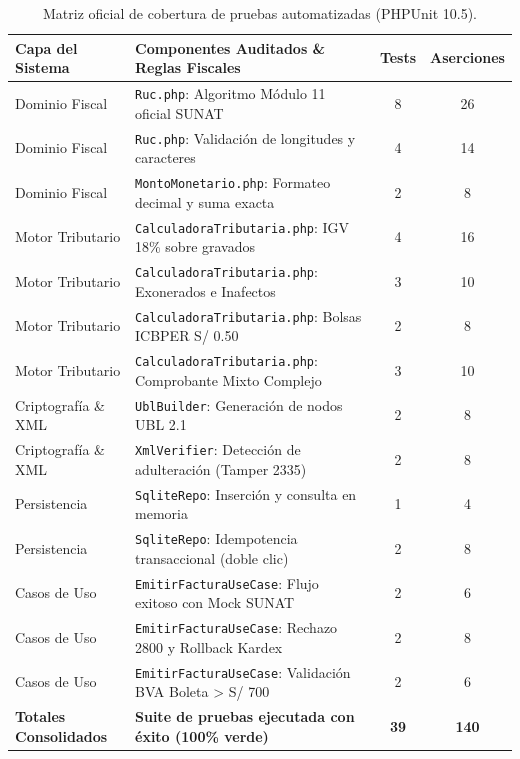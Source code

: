 \documentclass[11pt,a4paper]{article}
\begin{document}
\begin{table}[h!]
\centering
\small
\caption{Matriz oficial de cobertura de pruebas automatizadas (PHPUnit 10.5).}
\label{tab:matriz_cobertura}
\begin{tabularx}{\textwidth}{p{3.5cm}Xcc}
\toprule
\textbf{Capa del Sistema} & \textbf{Componentes Auditados \& Reglas Fiscales} & \textbf{Tests} & \textbf{Aserciones} \\
\midrule
Dominio Fiscal & \texttt{Ruc.php}: Algoritmo Módulo 11 oficial SUNAT & 8 & 26 \\
Dominio Fiscal & \texttt{Ruc.php}: Validación de longitudes y caracteres & 4 & 14 \\
Dominio Fiscal & \texttt{MontoMonetario.php}: Formateo decimal y suma exacta & 2 & 8 \\
\midrule
Motor Tributario & \texttt{CalculadoraTributaria.php}: IGV 18\% sobre gravados & 4 & 16 \\
Motor Tributario & \texttt{CalculadoraTributaria.php}: Exonerados e Inafectos & 3 & 10 \\
Motor Tributario & \texttt{CalculadoraTributaria.php}: Bolsas ICBPER S/ 0.50 & 2 & 8 \\
Motor Tributario & \texttt{CalculadoraTributaria.php}: Comprobante Mixto Complejo & 3 & 10 \\
\midrule
Criptografía \& XML & \texttt{UblBuilder}: Generación de nodos UBL 2.1 & 2 & 8 \\
Criptografía \& XML & \texttt{XmlVerifier}: Detección de adulteración (Tamper 2335) & 2 & 8 \\
\midrule
Persistencia & \texttt{SqliteRepo}: Inserción y consulta en memoria & 1 & 4 \\
Persistencia & \texttt{SqliteRepo}: Idempotencia transaccional (doble clic) & 2 & 8 \\
\midrule
Casos de Uso & \texttt{EmitirFacturaUseCase}: Flujo exitoso con Mock SUNAT & 2 & 6 \\
Casos de Uso & \texttt{EmitirFacturaUseCase}: Rechazo 2800 y Rollback Kardex & 2 & 8 \\
Casos de Uso & \texttt{EmitirFacturaUseCase}: Validación BVA Boleta > S/ 700 & 2 & 6 \\
\midrule
\textbf{Totales Consolidados} & \textbf{Suite de pruebas ejecutada con éxito (100\% verde)} & \textbf{39} & \textbf{140} \\
\bottomrule
\end{tabularx}
\end{table}

\end{document}
